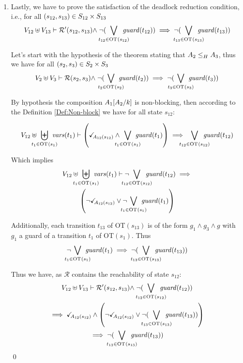 \documentclass[runningheads]{llncs}
\begin{document}
\begin{enumerate}
\item Lastly, we have to prove the satisfaction of the deadlock reduction condition, i.e., for all $\mpar{s_{12}, s_{13}} \in S_{12} \times S_{13}$
\begin{multline*}
V_{12} \uplus V_{13}  \vdash  \mathcal{R}'\mpar{s_{12}, s_{13}} \nwedge  \neg(\bigvee_\subbox{t_{12} \in \fOT{s_{12}}} \fguard{t_{12}}) \implies   \neg (\bigvee_\subbox{t_{13} \in \fOT{s_{13}}} \fguard{t_{13}}) 
\end{multline*}

Let's start  with the hypothesis of the theorem stating that $\wrel{A_2}{A_3}{H}$, thus we have for all  $\mpar{s_2, s_3} \in S_2 \times S_3$ 
\begin{multline*}
V_2 \uplus V_3  \vdash\mathcal{R}\mpar{s_2, s_3} \nwedge \neg (\bigvee_\subbox{t_2 \in \fOT{s_2}} \fguard{t_2}) \implies   \neg(\bigvee_\subbox{t_3 \in \fOT{s_3}} \fguard{t_3})
\end{multline*}

By hypothesis  the composition  \(A_1\subst{A_2}{k}\) is non-blocking,  then according to the Definition \ref{Def:Non-block} we have for all state $s_{12}$: 


\begin{multline*}
V_{12} \uplus \biguplus_\subbox{t_1 \in \fOT{s_1}} \fvars{t_1}  \vdash  \left(\reach{A_{12}(s_{12})} \land \bigvee_\subbox{t_1 \in \fOT{s_1}} \fguard{t_1}\right) \implies \bigvee_\subbox{t_{12} \in \fOT{s_{12}}} \fguard{t_{12}}
\end{multline*}

Which implies 
\begin{multline*}
V_{12} \uplus \biguplus_\subbox{t_1 \in \fOT{s_1}} \fvars{t_1}  \vdash 
\neg{ \bigvee_\subbox{t_{12} \in \fOT{s_{12}}} \fguard{t_{12}}}
\implies \\
\left(\neg{\reach{A_{12}(s_{12})} }\lor \neg{\bigvee_\subbox{t_1 \in \fOT{s_1}} \fguard{t_1}}
\right)
\end{multline*}

Additionally, each transition $t_{13}$ of OT$(s_{13})$ is of the form $
g_1\land g_3 \land g$ with $g_1$ a guard of a transition $t_{1}$ of OT$(s_{1})$.
Thus 
\[
\neg{\bigvee_\subbox{t_1 \in \fOT{s_1}} \fguard{t_1}}  \implies \neg (\bigvee_\subbox{t_{13} \in \fOT{s_{13}}} \fguard{t_{13}}) \]

Thus we have, as $\mathcal{R}$ contains the reachability of state $s_{12}$:
\begin{multline*}
V_{12} \uplus V_{13}  \vdash  \mathcal{R}'\mpar{s_{12}, s_{13}} \nwedge  \neg(\bigvee_\subbox{t_{12} \in \fOT{s_{12}}} \fguard{t_{12}}) \\
\implies \reach{A_{12}(s_{12})} \land \left(\neg{\reach{A_{12}(s_{12})} }\lor
\neg (\bigvee_\subbox{t_{13} \in \fOT{s_{13}}} \fguard{t_{13}})\right) \\
\implies
\neg (\bigvee_\subbox{t_{13} \in \fOT{s_{13}}} \fguard{t_{13}})
\end{multline*}
\qed

\end{enumerate}
\end{document}
